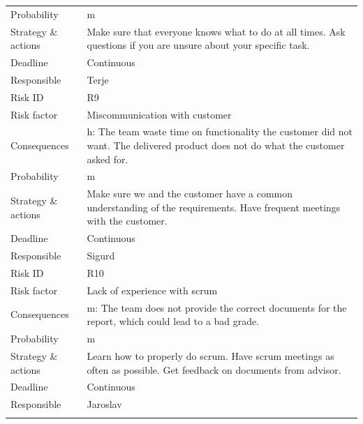 \begin{longtable}{>{\footnotesize}p{} >{\footnotesize}p{}}
	Probability & \Gls{m} \\ 
	Strategy \& actions & Make sure that everyone knows what to do at all times. Ask questions if you are unsure about your specific task. \\
	Deadline & Continuous \\
	Responsible & Terje \\
	\midrule
	Risk ID & R9 \\
	Risk factor & Miscommunication with customer \\
	Consequences & \Gls{h}: The team waste time on functionality the customer did not want. The delivered product does not do what the customer asked for. \\
	Probability & \Gls{m} \\ 
	Strategy \& actions & Make sure we and the customer have a common understanding of the requirements. Have frequent meetings with the customer.  \\
	Deadline & Continuous \\
	Responsible & Sigurd \\
	\midrule
	Risk ID & R10 \\
	Risk factor & Lack of experience with \Gls{scrum} \\
	Consequences & \Gls{m}: The team does not provide the correct documents for the report, which could lead to a bad grade. \\
	Probability & \Gls{m} \\ 
	Strategy \& actions & Learn how to properly do \Gls{scrum}. Have \Gls{scrum} meetings as often as possible. Get feedback on documents from advisor. \\
	Deadline & Continuous \\
	Responsible & Jaroslav \\
	\bottomrule
	\label{tab:risk}
\end{longtable}
